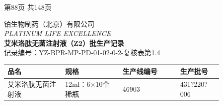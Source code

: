 \documentclass[UTF8,10pt,a4paper,fontset=fandol]{ctexart}
\newcommand{\fieldvalue}[1]{#1}
\newcommand{\handwritten}[1]{#1}
\begin{document}
\begin{center}
第88页 共148页
\end{center}

\newpage

\begin{center}
铂生物制药（北京）有限公司\\
\textit{PLATINUM LIFE EXCELLENCE}\\[2pt]
\textbf{艾米洛肽无菌注射液（Z2）批生产记录}\\
记录编号：YZ-BPR-MP-PD-01-02-0-2-复核表第1.4
\end{center}

\begin{tabular}{|p{0.23\linewidth}|p{0.23\linewidth}|p{0.23\linewidth}|p{0.17\linewidth}|}
\hline
品名 & 规格 & 生产线编号 & 生产批号 \\ \hline
艾米洛肽无菌注射液 & 12ml：6$\times$10个稀瓶 &
\fieldvalue{\handwritten{46903}} &
\fieldvalue{\handwritten{431?220?006}} \\ \hline
\end{tabular}
\end{document}
